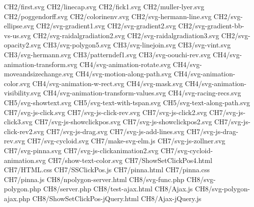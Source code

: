 CH2/first.svg
CH2/linecap.svg
CH2/fick1.svg
CH2/muller-lyer.svg
CH2/poggendorff.svg
CH2/colorinenv.svg
CH2/svg-hermann-line.svg
CH2/svg-ellipse.svg
CH2/svg-gradient1.svg
CH2/svg-gradient2.svg
CH2/svg-gradient-bb-vs-us.svg
CH2/svg-raidalgradiation2.svg
CH2/svg-raidalgradiation3.svg
CH2/svg-opacity2.svg
CH3/svg-polygon5.svg
CH3/svg-linejoin.svg
CH3/svg-vint.svg
CH3/svg-hermann.svg
CH3/patterndef1.svg
CH3/svg-oouchi-rev.svg
CH4/svg-animation-transform.svg
CH4/svg-animation-rotate.svg
CH4/svg-moveandsizechange.svg
CH4/svg-motion-along-path.svg
CH4/svg-animation-color.svg
CH4/svg-animation-w-rect.svg
CH4/svg-mask.svg
CH4/svg-animation-visibility.svg
CH4/svg-animation-transform-values.svg
CH4/svg-racing-recs.svg
CH5/svg-showtext.svg
CH5/svg-text-with-tspan.svg
CH5/svg-text-along-path.svg
CH7/svg-js-click.svg
CH7/svg-js-click-rev.svg
CH7/svg-js-click2.svg
CH7/svg-js-click3.svg
CH7/svg-js-showclickpos.svg
CH7/svg-js-showclickpos2.svg
CH7/svg-js-click-rev2.svg
CH7/svg-js-drag.svg
CH7/svg-js-add-lines.svg
CH7/svg-js-drag-rev.svg
CH7/svg-cycloid.svg
CH7/make-svg-elm.js
CH7/svg-js-zollner.svg
CH7/svg-pinna.svg
CH7/svg-js-clickanimation2.svg
CH7/svg-cycloid-animation.svg
CH7/show-text-color.svg
CH7/ShowSetClickPos4.html
CH7/HTML.css
CH7/SSClickPos.js
CH7/pinna.html
CH7/pinna.css
CH7/pinna.js
CH8/npolygon-server.html
CH8/svg-func.php
CH8/svg-polygon.php
CH8/server.php
CH8/test-ajax.html
CH8/Ajax.js
CH8/svg-polygon-ajax.php
CH8/ShowSetClickPos-jQuery.html
CH8/Ajax-jQuery.js
